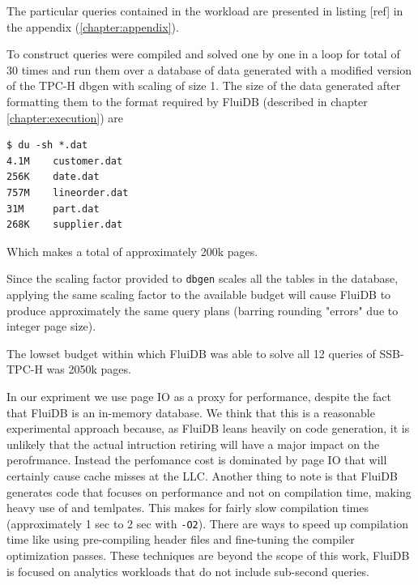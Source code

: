 The particular queries contained in the workload are presented in
listing [ref] in the appendix (\ref{chapter:appendix}).

To construct queries were compiled and solved one by one in a loop for
total of 30 times and run them over a database of data generated with
a modified version of the TPC-H dbgen
\cite{perivolaropoulosFakedrakeSsbdbgen2021a} with scaling of size
1. The size of the data generated after formatting them to the format
required by FluiDB (described in chapter \ref{chapter:execution}) are

\begin{verbatim}
$ du -sh *.dat
4.1M    customer.dat
256K    date.dat
757M    lineorder.dat
31M     part.dat
268K    supplier.dat
\end{verbatim}

Which makes a total of approximately 200k pages.

Since the scaling factor provided to \texttt{dbgen} scales all the tables in
the database, applying the same scaling factor to the available budget
will cause FluiDB to produce approximately the same query plans
(barring rounding "errors" due to integer page size).

The lowset budget within which FluiDB was able to solve all 12 queries
of SSB-TPC-H was 2050k pages.

In our expriment we use page IO as a proxy for performance, despite
the fact that FluiDB is an in-memory database. We think that this is a
reasonable experimental approach because, as FluiDB leans heavily on
code generation, it is unlikely that the actual intruction retiring
will have a major impact on the perofrmance. Instead the perfomance
cost is dominated by page IO that will certainly cause cache misses at
the LLC. Another thing to note is that FluiDB generates code that
focuses on performance and not on compilation time, making heavy use
of  and temlpates.  This makes for fairly slow compilation
times (approximately 1 sec to 2 sec with \texttt{-O2}). There are ways to
speed up compilation time like using pre-compiling header files
\cite{PrecompiledHeadersPCH} and fine-tuning the compiler optimization
passes. These techniques are beyond the scope of this work, FluiDB is
focused on analytics workloads that do not include sub-second queries.

